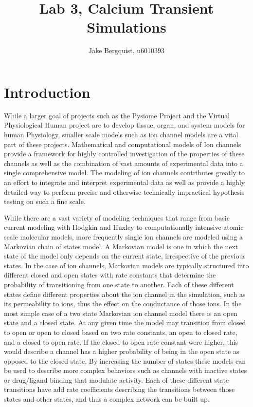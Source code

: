 \documentclass[11pt]{article}
\begin{document}
\title{Lab 3, Calcium Transient Simulations}
\author{Jake Bergquist, u6010393}
\maketitle
\tableofcontents
\newpage

\section{Introduction}
\par{}
While a larger goal of projects such as the Pysiome Project and the Virtual Physiological Human project are to develop tissue, organ, and system models for human Physiology, smaller scale models such as ion channel models are a vital part of these projects.\cite{Fink2011} Mathematical and computational models of Ion channels provide a framework for highly controlled investigation of the properties of these channels as well as the combination of vast amounts of experimental data into a single comprehensive model.  The modeling of ion channels contributes greatly to an effort to integrate and interpret experimental data as well as provide a highly detailed way to perform precise and otherwise technically impractical hypothesis testing on such a fine scale.
\par{}
While there are a vast variety of modeling techniques that range from basic current modeling with Hodgkin and Huxley to computationally intensive atomic scale molecular models, more frequently single ion channels are modeled using a Markovian chain of states model.\cite{Fink2011}\cite{Kojima2018a}
A Markovian model is one in which the next state of the model only depends on the current state, irrespective of the previous states. In the case of ion channels, Markovian models are typically structured into different closed and open states with rate constants that determine the probability of transitioning from one state to another. Each of these different states define different properties about the ion channel in the simulation, such as its permeability to ions, thus the effect on the conductance of those ions.\cite{Fink2011} In the most simple case of a two state Markovian ion channel model there is an open state and a closed state. At any given time the model may transition from closed to open or open to closed based on two rate constants, an open to closed rate, and a closed to open rate. If the closed to open rate constant were higher, this would describe a channel has a higher probability of being in the open state as opposed to the closed state. By increasing the number of states these models can be used to describe more complex behaviors such as channels with inactive states or drug/ligand binding that modulate activity. Each of these different state transitions have add rate coefficients describing the transitions between those states and other states, and thus a complex network can be built up.
\end{document}
